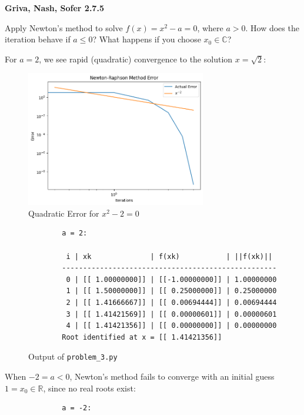 \textbf{Griva, Nash, Sofer 2.7.5}

Apply Newton's method to solve $f(x) = x^2 - a = 0$, where $a > 0$. How does the iteration behave if $a \le 0$? What
happens if you choose $x_0 \in \mathbb{C}$?

\begin{solution}
  For $a = 2$, we see rapid (quadratic) convergence to the solution $x = \sqrt{2}$:

  \begin{figure}[h]
      \centering
      \includegraphics*[width=0.7\textwidth]{problem_3.png}
      \caption{Quadratic Error for $x^2 - 2 = 0$}
  \end{figure}

  \begin{figure}[h]
    \small
      \begin{verbatim}
        a = 2:
        
         i | xk              | f(xk)           | ||f(xk)||    
        ---------------------------------------------------
         0 | [[ 1.00000000]] | [[-1.00000000]] | 1.00000000
         1 | [[ 1.50000000]] | [[ 0.25000000]] | 0.25000000
         2 | [[ 1.41666667]] | [[ 0.00694444]] | 0.00694444
         3 | [[ 1.41421569]] | [[ 0.00000601]] | 0.00000601
         4 | [[ 1.41421356]] | [[ 0.00000000]] | 0.00000000
        Root identified at x = [[ 1.41421356]]
      \end{verbatim}
    \normalsize
    \caption{Output of \texttt{problem\_3.py}}
  \end{figure}

  \pagebreak

  When $-2 = a < 0$, Newton's method fails to converge with an initial guess $1 = x_0 \in \mathbb{R}$, since no real
  roots exist:

  \begin{figure}[h]
    \small
    \begin{verbatim}
        a = -2:
        

\end{verbatim}
\end{figure}
\end{solution}
